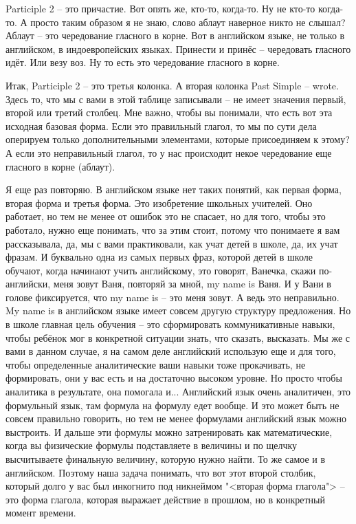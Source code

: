 \documentclass[main.tex]{subfiles}
\begin{document}
Participle 2 -- это причастие.
Вот опять же, кто-то, когда-то.
Ну не кто-то когда-то.
А просто таким образом я не знаю, слово аблаут наверное никто не слышал?
Аблаут -- это чередование гласного в корне.
Вот в английском языке, не только в английском, в индоевропейских языках.
Принести и принёс -- чередовать гласного идёт.
Или везу воз.
Ну то есть это чередование гласного в корне.

Итак, Participle 2 -- это третья колонка.
А вторая колонка Past Simple -- wrote.
Здесь то, что мы с вами в этой таблице записывали -- не имеет значения первый, второй или третий столбец.
Мне важно, чтобы вы понимали, что есть вот эта исходная базовая форма.
Если это правильный глагол, то мы по сути дела оперируем только дополнительными элементами, которые присоединяем к этому?
А если это неправильный глагол, то у нас происходит некое чередование еще гласного в корне (аблаут).

Я еще раз повторяю.
В английском языке нет таких понятий, как первая форма, вторая форма и третья форма.
Это изобретение школьных учителей.
Оно работает, но тем не менее от ошибок это не спасает, но для того, чтобы это работало, нужно еще понимать, что за этим стоит, потому что понимаете я вам рассказывала, да, мы с вами практиковали, как учат детей в школе, да, их учат фразам.
И буквально одна из самых первых фраз, которой детей в школе обучают, когда начинают учить английскому, это говорят, Ванечка, скажи по-английски, меня зовут Ваня, повторяй за мной, my name is Ваня.
И у Вани в голове фиксируется, что my name is -- это меня зовут.
А ведь это неправильно.
My name is в английском языке имеет совсем другую структуру предложения.
Но в школе главная цель обучения -- это сформировать коммуникативные навыки, чтобы ребёнок мог в конкретной ситуации знать, что сказать, высказать.
Мы же с вами в данном случае, я на самом деле английский использую еще и для того, чтобы определенные аналитические ваши навыки тоже прокачивать, не формировать, они у вас есть и на достаточно высоком уровне.
Но просто чтобы аналитика в результате, она помогала и...
Английский язык очень аналитичен, это формульный язык, там формула на формулу едет вообще.
И это может быть не совсем правильно говорить, но тем не менее формулами английский язык можно выстроить.
И дальше эти формулы можно затренировать как математические, когда вы физические формулы подставляете в величины и по щелчку высчитываете финальную величину, которую нужно найти.
То же самое и в английском.
Поэтому наша задача понимать, что вот этот второй столбик, который долго у вас был инкогнито под никнеймом "<вторая форма глагола"> -- это форма глагола, которая выражает действие в прошлом, но в конкретный момент времени.
\end{document}

